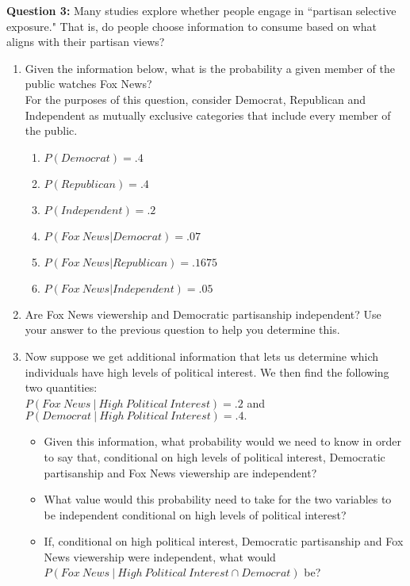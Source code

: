 \documentclass[10pt]{amsart}
\begin{document}
\textbf{Question 3:}
Many studies explore whether people engage in ``partisan selective exposure." That is, do people choose information to consume based on what aligns with their partisan views?
\begin{enumerate}
\item Given the information below, what is the probability a given member of the public watches Fox News?\\

For the purposes of this question, consider Democrat, Republican and Independent as mutually exclusive categories that include every member of the public.

\begin{multicols}{2}
\begin{enumerate}
\item[] $P(Democrat) = .4$
\item[] $P(Republican) = .4$
\item[] $P(Independent) = .2$
\item[] $P(Fox \ News | Democrat) = .07$
\item[] $P(Fox \ News | Republican) = .1675$
\item[] $P(Fox \ News | Independent) = .05$
\end{enumerate}
\end{multicols}

\item Are Fox News viewership and Democratic partisanship independent? Use your answer to the previous question to help you determine this. 

\item Now suppose we get additional information that lets us determine which individuals have high levels of political interest. We then find the following two quantities: \\
$P(Fox \ News \  | \ High \ Political  \ Interest) = .2$ and  $P(Democrat \ |  \ High \ Political  \ Interest) = .4.$
	\begin{itemize}
	\item Given this information, what probability would we need to know in order to say that, conditional on high levels of political interest, Democratic partisanship and Fox News viewership are independent?
	 \item What value would this probability need to take for the two variables to be independent conditional on high levels of political interest?
	 \item If, conditional on high political interest, Democratic partisanship and Fox News viewership were independent, what would $P(Fox \ News \ | \ High \ Political \ Interest \cap Democrat)$ be?
	\end{itemize}
\end{enumerate}
\end{document}
